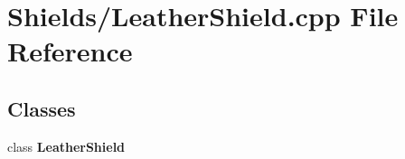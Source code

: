 \section{Shields/\-Leather\-Shield.cpp File Reference}
\label{_leather_shield_8cpp}
\subsection*{Classes}
\begin{DoxyCompactItemize}
\item 
class {\bf Leather\-Shield}
\end{DoxyCompactItemize}
